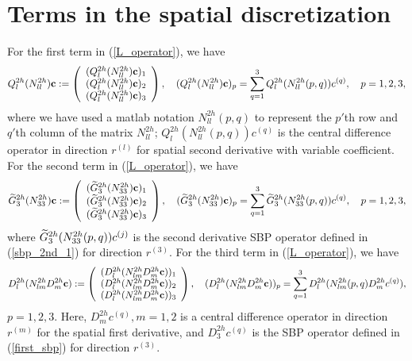 \section{Terms in the spatial discretization}\label{appendix_cdomain}
For the first term in (\ref{L_operator}), we have
\begin{align}\label{3_8_1}
{Q}_l^{2h}({N}_{ll}^{2h}){\bf c} := \left(\begin{array}{c}
({Q}_l^{2h}({N}_{ll}^{2h}){\bf c})_1 \\
({Q}_l^{2h}({N}_{ll}^{2h}){\bf c})_2 \\
({Q}_l^{2h}({N}_{ll}^{2h}){\bf c})_3 
\end{array}\right), \quad ({Q}_l^{2h}({N}_{ll}^{2h}){\bf c})_p = \sum_{q = 1}^{3} Q_l^{2h}(N_{ll}^{2h}(p,q)) {c}^{(q)},\quad p = 1,2,3,
\end{align}
where we have used a matlab notation $N_{ll}^{2h}(p,q)$ to represent the $p'$th row and $q'$th column of the matrix $N_{ll}^{2h}$; $Q_l^{2h}(N_{ll}^{2h}(p,q)){ c}^{(q)}$ is the central difference operator in direction $r^{(l)}$ for spatial second derivative with variable coefficient. For the second term in (\ref{L_operator}), we have
\begin{align}\label{3_8_2}
\wt{{G}}_3^{2h}({N}_{33}^{2h}){\bf c} := \left(\begin{array}{c}
(\wt{{G}}_3^{2h}({N}_{33}^{2h}){\bf c})_1 \\
(\wt{{G}}_3^{2h}({N}_{33}^{2h}){\bf c})_2 \\
(\wt{{G}}_3^{2h}({N}_{33}^{2h}){\bf c})_3 
\end{array}\right), \quad (\wt{{G}}_3^{2h}({N}_{33}^{2h}){\bf c})_p = \sum_{q = 1}^{3} \wt{G}_3^{2h}(N_{33}^{2h}(p,q)) {c}^{(q)},\quad p = 1,2,3,
\end{align}
where $\widetilde{G}_3^{2h}(N_{33}^{2h}(p,q)) {c}^{(j)}$ is the second derivative SBP operator  defined in (\ref{sbp_2nd_1}) for direction $r^{(3)}$. For the third term in (\ref{L_operator}), we have
\begin{align}\label{3_8_3}
{D}_l^{2h}({N}_{lm}^{2h}{D}_m^{2h}{\bf c}) := \left(\begin{array}{c}
(D^{2h}_l(N^{2h}_{lm}D_m^{2h}{\bf c}))_1 \\
(D^{2h}_l(N^{2h}_{lm}D_m^{2h}{\bf c}))_2 \\
(D^{2h}_l(N^{2h}_{lm}D_m^{2h}{\bf c}))_3 
\end{array}\right), \quad (D^{2h}_l(N^{2h}_{lm}D_m^{2h}{\bf c}))_p = \sum_{q = 1}^{3} D^{2h}_l(N^{2h}_{lm}(p,q)D_m^{2h}{c}^{(q)}),
\end{align}
$p = 1,2,3$. Here, $D_m^{2h}c^{(q)}, m = 1,2$ is a central difference operator in direction $r^{(m)}$ for the spatial first derivative, and $D_3^{2h}c^{(q)}$ is the SBP operator defined in (\ref{first_sbp}) for direction $r^{(3)}$.

